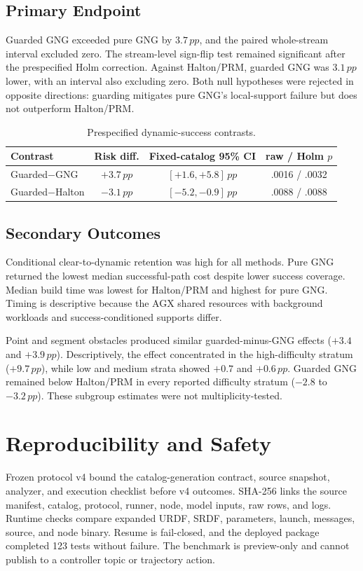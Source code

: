 \documentclass[letterpaper,10pt,conference]{ieeeconf}
\newcommand{\pp}{\,pp}
\begin{document}
\subsection{Primary Endpoint}
Guarded GNG exceeded pure GNG by $3.7\pp$, and the paired whole-stream interval excluded zero. The stream-level sign-flip test remained significant after the prespecified Holm correction. Against Halton/PRM, guarded GNG was $3.1\pp$ lower, with an interval also excluding zero. Both null hypotheses were rejected in opposite directions: guarding mitigates pure GNG's local-support failure but does not outperform Halton/PRM.

\begin{table}[t]
\caption{Prespecified dynamic-success contrasts.}
\label{tab:primary}
\centering
\footnotesize
\begin{tabular}{@{}lccc@{}}
\toprule
Contrast & Risk diff. & Fixed-catalog 95\% CI & raw / Holm $p$ \\
\midrule
Guarded$-$GNG & $+3.7\pp$ & $[+1.6,+5.8]\pp$ & .0016 / .0032 \\
Guarded$-$Halton & $-3.1\pp$ & $[-5.2,-0.9]\pp$ & .0088 / .0088 \\
\bottomrule
\end{tabular}
\end{table}

\subsection{Secondary Outcomes}
Conditional clear-to-dynamic retention was high for all methods. Pure GNG returned the lowest median successful-path cost despite lower success coverage. Median build time was lowest for Halton/PRM and highest for pure GNG. Timing is descriptive because the AGX shared resources with background workloads and success-conditioned supports differ.

Point and segment obstacles produced similar guarded-minus-GNG effects ($+3.4$ and $+3.9\pp$). Descriptively, the effect concentrated in the high-difficulty stratum ($+9.7\pp$), while low and medium strata showed $+0.7$ and $+0.6\pp$. Guarded GNG remained below Halton/PRM in every reported difficulty stratum ($-2.8$ to $-3.2\pp$). These subgroup estimates were not multiplicity-tested.

\balance
\section{Reproducibility and Safety}
Frozen protocol v4 bound the catalog-generation contract, source snapshot, analyzer, and execution checklist before v4 outcomes. SHA-256 links the source manifest, catalog, protocol, runner, node, model inputs, raw rows, and logs. Runtime checks compare expanded URDF, SRDF, parameters, launch, messages, source, and node binary. Resume is fail-closed, and the deployed package completed 123 tests without failure. The benchmark is preview-only and cannot publish to a controller topic or trajectory action.
\end{document}
